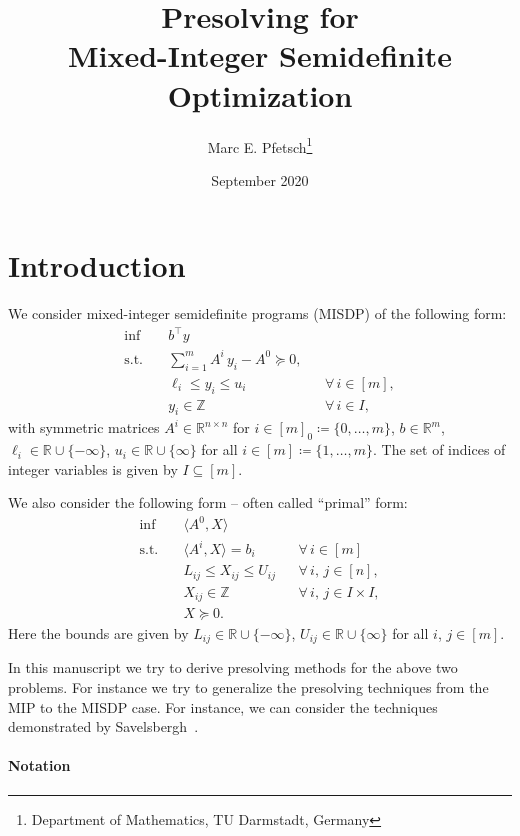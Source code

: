 \documentclass[10pt, a4paper]{article}
\title{Presolving for\\ Mixed-Integer Semidefinite Optimization}
\author{Marc E. Pfetsch\thanks{Department of Mathematics, TU Darmstadt, Germany}}
\date{September 2020}
\newcommand{\define}{\coloneqq}
\newcommand{\skal}[2]{\langle{#1},{#2}\rangle}
\newcommand{\T}{^{\top}}
\newcommand{\R}{\mathds{R}}
\newcommand{\Z}{\mathds{Z}}
\begin{document}
\maketitle

\section{Introduction}

We consider mixed-integer semidefinite programs (MISDP) of the following
form:
\begin{equation}\label{MISDP}
  \begin{aligned}
    \inf \quad & b\T y \\
    \text{s.t.} \quad & \sum_{i=1}^m A^i\, y_i - A^0 \succeq 0, \\
    & \ell_i \leq y_i \leq u_i && \forall\, i \in [m], \\
    & y_i \in \Z && \forall\, i \in I,
  \end{aligned}
\end{equation}
with symmetric matrices $A^i \in \R^{n \times n}$ for
$i \in [m]_0 \define \{0, \dots, m\}$, $b \in \R^m$,
$\ell_i \in \R \cup \{- \infty\}$, $u_i \in \R \cup \{\infty\}$ for all
$i \in [m] \define \{1, \dots, m\}$. The set of indices of integer
variables is given by $I \subseteq [m]$.

We also consider the following form -- often called ``primal'' form:
\begin{equation}\label{MISDP-P}
  \begin{aligned}
    \inf \quad & \skal{A^0}{X} \\
    \text{s.t.} \quad & \skal{A^i}{X} = b_i && \forall\, i \in [m] \\
    & L_{ij} \leq X_{ij} \leq U_{ij} && \forall\, i,\,j \in [n], \\
    & X_{ij} \in \Z && \forall\, i,\,j \in I \times I,\\
    & X \succeq 0.
  \end{aligned}
\end{equation}
Here the bounds are given by $L_{ij} \in \R \cup \{- \infty\}$, $U_{ij} \in \R \cup \{\infty\}$ for all
$i$, $j \in [m]$.

In this manuscript we try to derive presolving methods for the above two
problems. For instance we try to generalize the presolving techniques from
the MIP to the MISDP case. For instance, we can consider the techniques
demonstrated by Savelsbergh~\cite{Sav94}.

\paragraph{Notation}
\end{document}
